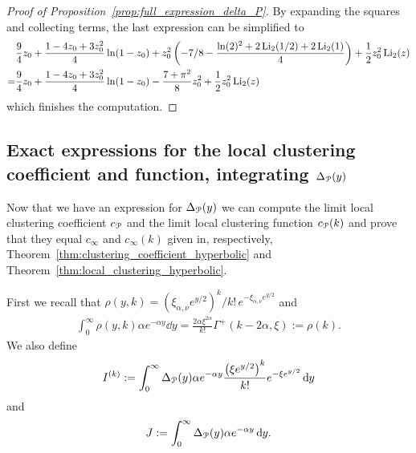\begin{proof}[Proof of Proposition~\ref{prop:full_expression_delta_P}]
By expanding the squares and collecting terms, the last expression can be simplified to
\begin{align*}
&\frac{9}{4} z_0 + \frac{1 - 4 z_0 + 3 z_0^2}{4}\ln(1 - z_0) + 
z_0^2 \left(-7/8 - \frac{\ln(2)^2+2\operatorname{Li}_2(1/2) + 2\operatorname{Li}_2(1)}{4} \right) + 
\frac{1}{2}z_0^2 \operatorname{Li}_2(z) \\
=&\frac{9}{4} z_0 + \frac{1 - 4 z_0 + 3 z_0^2}{4}\ln(1 - z_0) - \frac{7+\pi^2}{8}
z_0^2  + 
\frac{1}{2}z_0^2 \operatorname{Li}_2(z)
\end{align*}
which finishes the computation.

\end{proof}

\subsection{Exact expressions for the local clustering coefficient and function, integrating $\Delta_{{\mathcal P}}(y)$}\label{ssec:exact_expressions_clustering_P}

Now that we have an expression for $\Delta_{{\mathcal P}}(y)$ we can compute the limit local clustering coefficient $c_{{\mathcal P}}$ and the limit local clustering function $c_{{\mathcal P}}(k)$ and prove that they equal $c_\infty$ and $c_\infty(k)$ given in, respectively, Theorem~\ref{thm:clustering_coefficient_hyperbolic} and Theorem~\ref{thm:local_clustering_hyperbolic}.


First we recall that $\rho(y,k) = (\xi_{\alpha,\nu} e^{y/2})^k/k! \, e^{-\xi_{\alpha,\nu} e^{y/2}}$ and
\begin{align*}
	\int_0^\infty \rho(y,k) \alpha e^{-\alpha y} \dd y = \frac{2\alpha \xi^{2\alpha}}{k!} \Gamma^+(k-2\alpha,\xi)
	:= \rho(k).
\end{align*}
We also define
\[
	I^{(k)} := \int_0^{\infty} \Delta_{{\mathcal P}}(y) \alpha e^{-\alpha y} \frac{\left(\xi e^{y/2}\right)^k}{k!} e^{-\xi e^{y/2}} \operatorname{\mathrm{d}\hspace{-2pt}} y
\]
and
\[
	J := \int_0^\infty \Delta_{{\mathcal P}}(y) \alpha e^{-\alpha y} \operatorname{\mathrm{d}\hspace{-2pt}} y.
\]

